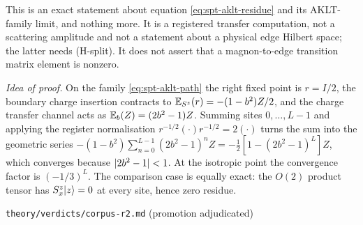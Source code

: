 \begin{scope}
This is an exact statement about equation \eqref{eq:spt-aklt-residue} and its
AKLT-family limit, and nothing more. It is a registered transfer computation,
not a scattering amplitude and not a statement about a physical edge Hilbert
space; the latter needs (H-split). It does not assert that a
magnon-to-edge transition matrix element is nonzero.
\end{scope}

\emph{Idea of proof.} On the family \eqref{eq:spt-aklt-path} the right fixed
point is $r=I/2$, the boundary charge insertion contracts to
$\mathbb{E}_{S^{z}}(r)=-(1-b^{2})Z/2$, and the charge transfer channel acts as
$\mathbb{E}_b(Z)=(2b^{2}-1)Z$. Summing sites $0,\dots,L-1$ and applying the
register normalisation $r^{-1/2}(\cdot)r^{-1/2}=2(\cdot)$ turns the sum into
the geometric series
$-(1-b^{2})\sum_{n=0}^{L-1}(2b^{2}-1)^{n}Z=-\tfrac12[1-(2b^{2}-1)^{L}]Z$,
which converges because $\lvert 2b^{2}-1\rvert<1$. At the isotropic point the
convergence factor is $(-1/3)^{L}$. The comparison case is equally exact: the
$O(2)$ product tensor has $S^{z}_x|z\rangle=0$ at every site, hence zero
residue.

%
{\texttt{theory/verdicts/corpus-r2.md} (promotion adjudicated)}

